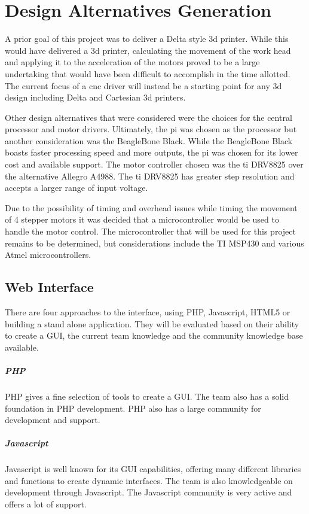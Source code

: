 \chapter{Design Alternatives Generation}
A prior goal of this project was to deliver a Delta style \gls{3d} printer.
While this would have delivered a \gls{3d} printer, calculating the movement of the work head and applying it to the acceleration of the motors proved to be a large undertaking that would have been difficult to accomplish in the time allotted.
The current focus of a \gls{cnc} driver will instead be a starting point for any \gls{3d} design including Delta and Cartesian \gls{3d} printers.

Other design alternatives that were considered were the choices for the central processor and motor drivers.
Ultimately, the \gls{pi} was chosen as the processor but another consideration was the BeagleBone Black.
While the BeagleBone Black boasts faster processing speed and more outputs, the \gls{pi} was chosen for its lower cost and available support.
The motor controller chosen was the \gls{ti} DRV8825 over the alternative Allegro A4988. The \gls{ti} DRV8825 has greater step resolution and accepts a larger range of input voltage.

Due to the possibility of timing and overhead issues while timing the movement of 4 stepper motors it was decided that a microcontroller would be used to handle the motor control.
The microcontroller that will be used for this project remains to be determined, but considerations include the TI MSP430 and various Atmel microcontrollers.

\section{Web Interface}
There are four approaches to the interface, using PHP, Javascript, HTML5 or building a stand alone application.
They will be evaluated based on their ability to create a GUI, the current team knowledge and the community knowledge base available. 

\paragraph{PHP} PHP gives a fine selection of tools to create a GUI.
The team also has a solid foundation in PHP development.
PHP also has a large community for development and support.

\paragraph{Javascript} Javascript is well known for its GUI capabilities, offering many different libraries and functions to create dynamic interfaces. 
The team is also knowledgeable on development through Javascript.
The Javascript community is very active and offers a lot of support.

